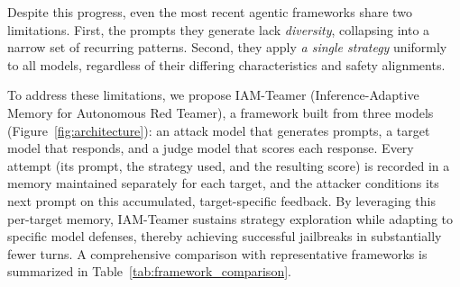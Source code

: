 \documentclass[a4paper,fleqn]{cas-sc}
\begin{document}
Despite this progress, even the most recent agentic frameworks share two limitations.
First, the prompts they generate lack \emph{diversity}, collapsing into a narrow set of recurring patterns.
Second, they apply \emph{a single strategy} uniformly to all models, regardless of their differing characteristics and safety alignments.

To address these limitations, we propose IAM-Teamer (Inference-Adaptive Memory for Autonomous Red Teamer), a framework built from three models (Figure~\ref{fig:architecture}): an attack model that generates prompts, a target model that responds, and a judge model that scores each response.
Every attempt (its prompt, the strategy used, and the resulting score) is recorded in a memory maintained separately for each target, and the attacker conditions its next prompt on this accumulated, target-specific feedback.
By leveraging this per-target memory, IAM-Teamer sustains strategy exploration while adapting to specific model defenses, thereby achieving successful jailbreaks in substantially fewer turns.
A comprehensive comparison with representative frameworks is summarized in Table~\ref{tab:framework_comparison}.
\end{document}
